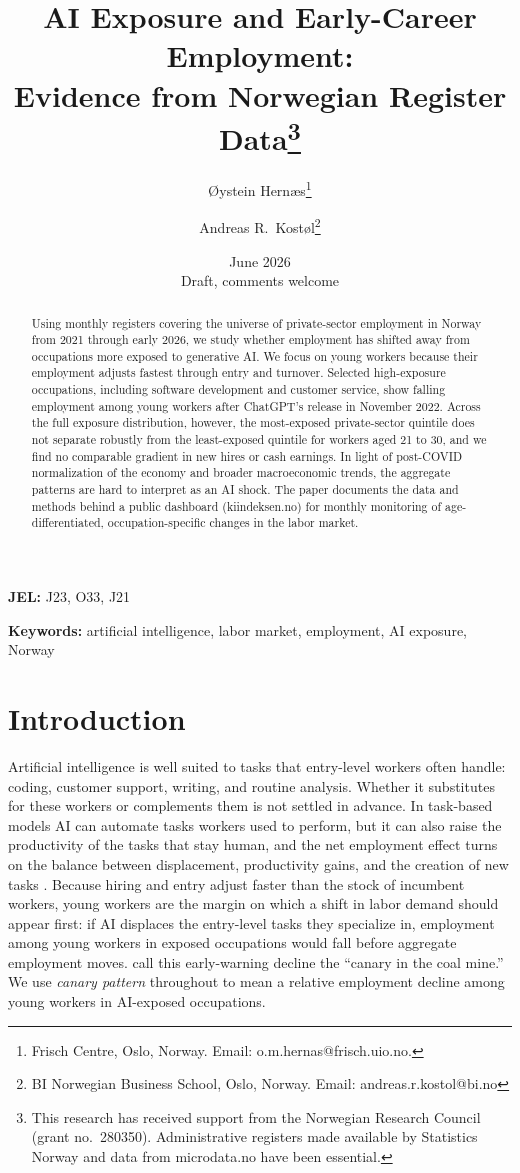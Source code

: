 \documentclass[12pt]{article}
\title{\textbf{AI Exposure and Early-Career Employment:\\Evidence from Norwegian Register Data}\thanks{This research has received support from the Norwegian Research Council (grant no.\ 280350). Administrative registers made available by Statistics Norway and data from microdata.no have been essential.}}
\author{
  {\O}ystein Hern{\ae}s\thanks{Frisch Centre, Oslo, Norway. Email: o.m.hernas@frisch.uio.no.}
  \and
  Andreas R.\ Kost{\o}l\thanks{BI Norwegian Business School, Oslo, Norway. Email: andreas.r.kostol@bi.no}
}
\date{June 2026\\[6pt]\small Draft, comments welcome}
\begin{document}
\maketitle

\begin{abstract}
\noindent
Using monthly registers covering the universe of private-sector employment in Norway from 2021 through early 2026, we study whether employment has shifted away from occupations more exposed to generative AI. We focus on young workers because their employment adjusts fastest through entry and turnover. Selected high-exposure occupations, including software development and customer service, show falling employment among young workers after ChatGPT's release in November 2022. Across the full exposure distribution, however, the most-exposed private-sector quintile does not separate robustly from the least-exposed quintile for workers aged 21 to 30, and we find no comparable gradient in new hires or cash earnings. In light of post-COVID normalization of the economy and broader macroeconomic trends, the aggregate patterns are hard to interpret as an AI shock. The paper documents the data and methods behind a public dashboard (kiindeksen.no) for monthly monitoring of age-differentiated, occupation-specific changes in the labor market.
\end{abstract}

\textbf{JEL:} J23, O33, J21

\textbf{Keywords:} artificial intelligence, labor market, employment, AI exposure, Norway

\clearpage
\setcounter{page}{1}


\section{Introduction}
\label{sec:introduction}

Artificial intelligence is well suited to tasks that entry-level workers often handle: coding, customer support, writing, and routine analysis. Whether it substitutes for these workers or complements them is not settled in advance. In task-based models AI can automate tasks workers used to perform, but it can also raise the productivity of the tasks that stay human, and the net employment effect turns on the balance between displacement, productivity gains, and the creation of new tasks \citep{acemoglu2025}. Because hiring and entry adjust faster than the stock of incumbent workers, young workers are the margin on which a shift in labor demand should appear first: if AI displaces the entry-level tasks they specialize in, employment among young workers in exposed occupations would fall before aggregate employment moves. \citet{brynjolfsson2025} call this early-warning decline the ``canary in the coal mine.'' We use \emph{canary pattern} throughout to mean a relative employment decline among young workers in AI-exposed occupations.
\end{document}

